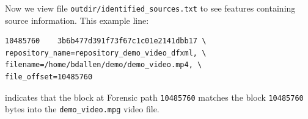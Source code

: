 \documentclass[12pt,twoside]{article}
\begin{document}
Now we view file \texttt{outdir/identified\_sources.txt} to see
features containing source information.
This example line:
\begin{verbatim}
10485760    3b6b477d391f73f67c1c01e2141dbb17 \
repository_name=repository_demo_video_dfxml, \
filename=/home/bdallen/demo/demo_video.mp4, \
file_offset=10485760
\end{verbatim}

indicates that the block at Forensic path \texttt{10485760}
matches the block \texttt{10485760} bytes into the
\texttt{demo\_video.mpg} video file.
\end{document}

